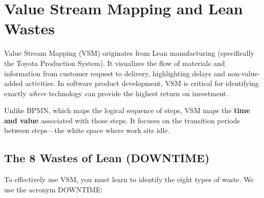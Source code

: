 \bigskip

\section{Value Stream Mapping and Lean
Wastes}\label{value-stream-mapping-and-lean-wastes}

Value Stream Mapping (VSM) originates from Lean manufacturing
(specifically the Toyota Production System). It visualizes the flow of
materials and information from customer request to delivery,
highlighting delays and non-value-added activities. In software product
development, VSM is critical for identifying exactly \emph{where}
technology can provide the highest return on investment.

Unlike BPMN, which maps the logical sequence of steps, VSM maps the
\textbf{time and value} associated with those steps. It focuses on the
transition periods between steps---the white space where work sits idle.

\subsection{The 8 Wastes of Lean
(DOWNTIME)}\label{the-8-wastes-of-lean-downtime}

To effectively use VSM, you must learn to identify the eight types of
waste. We use the acronym DOWNTIME:

